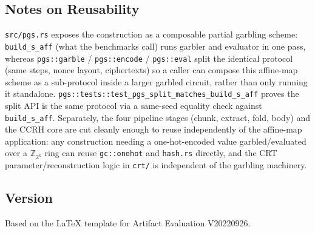 \documentclass[nonacm,sigconf]{acmart}
\begin{document}
\subsection{Notes on Reusability}
\texttt{src/pgs.rs} exposes the construction as a composable partial
garbling scheme: \texttt{build\_s\_aff} (what the benchmarks call) runs
garbler and evaluator in one pass, whereas \texttt{pgs::garble} /
\texttt{pgs::encode} / \texttt{pgs::eval} split the identical protocol
(same steps, nonce layout, ciphertexts) so a caller can compose this
affine-map scheme as a sub-protocol inside a larger garbled circuit, rather
than only running it standalone. \texttt{pgs::tests::test\_pgs\_split\_matches\_build\_s\_aff}
proves the split API is the same protocol via a same-seed equality check
against \texttt{build\_s\_aff}. Separately, the four pipeline stages
(chunk, extract, fold, body) and the CCRH core are cut cleanly enough to
reuse independently of the affine-map application: any construction
needing a one-hot-encoded value garbled/evaluated over a
$\mathbb{Z}_{2^k}$ ring can reuse \texttt{gc::onehot} and \texttt{hash.rs}
directly, and the CRT parameter/reconstruction logic in \texttt{crt/} is
independent of the garbling machinery.

\subsection{Version}
Based on the LaTeX template for Artifact Evaluation V20220926.
\end{document}
